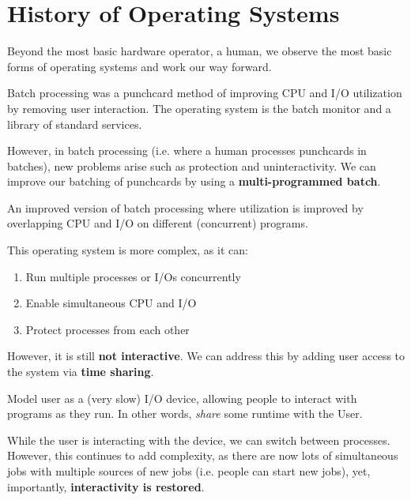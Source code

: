 \section{History of Operating Systems}
Beyond the most basic hardware operator, a human, we observe the most basic forms of operating systems and work our way forward.

\begin{definition}
	Batch processing was a punchcard method of improving CPU and I/O utilization by removing user interaction. The operating system is the batch monitor and a library of standard services.
\end{definition}

However, in batch processing (i.e. where a human processes punchcards in batches), new problems arise such as protection and uninteractivity. We can improve our batching of punchcards by using a \textbf{multi-programmed batch}.

\begin{definition}
	An improved version of batch processing where utilization is improved by overlapping CPU and I/O on different (concurrent) programs.
\end{definition}

This operating system is more complex, as it can:
\begin{enumerate}[label=\roman*.]
	\item Run multiple processes or I/Os concurrently
	\item Enable simultaneous CPU and I/O
	\item Protect processes from each other
\end{enumerate}
However, it is still \textbf{not interactive}. We can address this by adding user access to the system via \textbf{time sharing}.

\begin{definition}
	Model user as a (very slow) I/O device, allowing people to interact with programs as they run. In other words, \emph{share} some runtime with the User.
\end{definition}

While the user is interacting with the device, we can switch between processes. However, this continues to add complexity, as there are now lots of simultaneous jobs with multiple sources of new jobs (i.e. people can start new jobs), yet, importantly, \textbf{interactivity is restored}.
